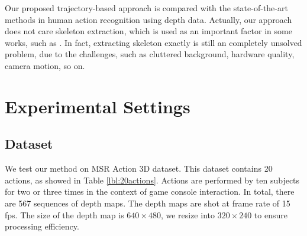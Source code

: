 \documentclass[review]{elsarticle}
\begin{document}
Our proposed trajectory-based approach is compared with the state-of-the-art methods in human action recognition using depth data. Actually, our approach does not care skeleton extraction, which is used as an important factor in some works, such as \cite{wang2012mining, yang2012eigenjoints}. In fact, extracting skeleton exactly is still an completely unsolved problem, due to the challenges, such as cluttered background, hardware quality, camera motion, so on.

\section{Experimental Settings}
\label{lbl:ExperimentalSettings}

\subsection{Dataset}
\label{lbl:ExperimentalSettings_Dataset}
We test our method on MSR Action 3D dataset. This dataset contains 20 actions, as showed in Table \ref{lbl:20actions}. Actions are performed by ten subjects for two or three times in the context of game console interaction. In total, there are 567 sequences of depth maps. The depth maps are shot at frame rate of 15 fps. The size of the depth map is $640 \times 480$, we resize into $320 \times 240$ to ensure processing efficiency.
\end{document}
